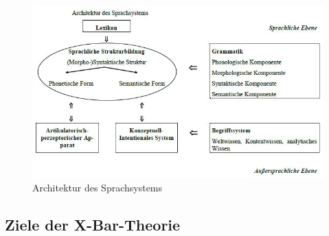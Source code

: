 
\begin{frame}

\begin{figure}
\centering
	\includegraphics[scale=.3]{material/03ArchitekturSprachsystem}
	\caption{Architektur des Sprachsystems}
\end{figure}


\end{frame}


\subsection{Ziele der X-Bar-Theorie}


